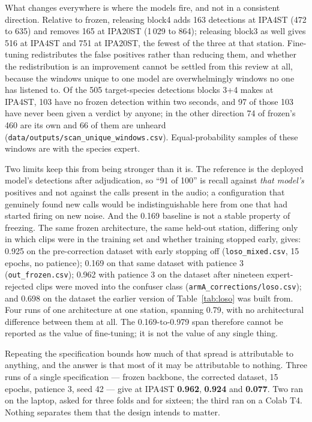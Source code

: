 \documentclass[review,3p,times]{elsarticle}
\begin{document}
What changes everywhere is where the models fire, and not in a consistent
direction. Relative to frozen, releasing block4 adds 163 detections at IPA4ST
(472 to 635) and removes 165 at IPA20ST (1\,029 to 864); releasing block3 as
well gives 516 at IPA4ST and 751 at IPA20ST, the fewest of the three at that
station. Fine-tuning redistributes the false positives rather than reducing them,
and whether the redistribution is an improvement cannot be settled from this
review at all, because the windows unique to one model are overwhelmingly windows
no one has listened to. Of the 505 target-species detections blocks 3+4 makes at
IPA4ST, 103 have no frozen detection within two seconds, and 97 of those 103 have
never been given a verdict by anyone; in the other direction 74 of frozen's 460
are its own and 66 of them are unheard
(\texttt{data/outputs/scan\_unique\_windows.csv}). Equal-probability samples of
these windows are with the species expert.

Two limits keep this from being stronger than it is. The reference is the
deployed model's detections after adjudication, so ``91 of 100'' is recall
against \emph{that model's} positives and not against the calls present in the
audio; a configuration that genuinely found new calls would be indistinguishable
here from one that had started firing on new noise. And the 0.169 baseline is not
a stable property of freezing. The same frozen architecture, the same held-out
station, differing only in which clips were in the training set and whether
training stopped early, gives: 0.925 on the pre-correction dataset with early
stopping off (\texttt{loso\_mixed.csv}, 15 epochs, no patience); 0.169 on that
same dataset with patience 3 (\texttt{out\_frozen.csv}); 0.962 with patience 3
on the dataset after nineteen expert-rejected clips were moved into the confuser
class (\texttt{armA\_corrections/loso.csv}); and 0.698 on the dataset the earlier
version of Table~\ref{tab:loso} was built from. Four runs of one architecture at
one station, spanning 0.79, with no architectural difference between them at
all. The 0.169-to-0.979 span therefore cannot be reported as the value of
fine-tuning; it is not the value of any single thing.

Repeating the specification bounds how much of that spread is attributable to
anything, and the answer is that most of it may be attributable to nothing.
Three runs of a single specification --- frozen backbone, the corrected dataset,
15 epochs, patience 3, seed 42 --- give at IPA4ST \textbf{0.962}, \textbf{0.924}
and \textbf{0.077}. Two ran on the laptop, asked for three folds and for sixteen;
the third ran on a Colab T4. Nothing separates them that the design intends to
matter.
\end{document}
